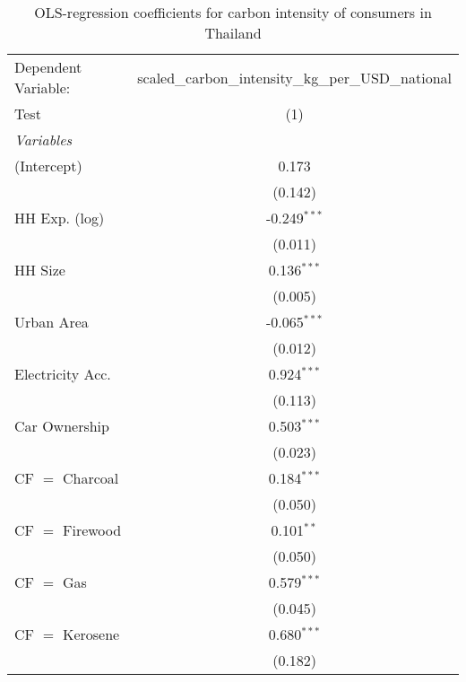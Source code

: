
\begin{table}[htbp!]
   \centering
   \small
   \begin{adjustbox}{width = 1\textwidth, max height = 0.95\textheight, center}
      \begin{threeparttable}[b]
         \caption{\label{tab:OLS_1_THA} OLS-regression coefficients for carbon intensity of consumers in Thailand}
         \begin{tabular}{lc}
            \tabularnewline \midrule \midrule
            Dependent Variable: & scaled\_carbon\_intensity\_kg\_per\_USD\_national\\        
            Test                & (1)\\  
            \midrule
            \emph{Variables}\\
            (Intercept)         & 0.173\\   
                                & (0.142)\\   
            HH Exp. (log)       & -0.249$^{***}$\\   
                                & (0.011)\\   
            HH Size             & 0.136$^{***}$\\   
                                & (0.005)\\   
            Urban Area          & -0.065$^{***}$\\   
                                & (0.012)\\   
            Electricity Acc.    & 0.924$^{***}$\\   
                                & (0.113)\\   
            Car Ownership       & 0.503$^{***}$\\   
                                & (0.023)\\   
            CF $=$ Charcoal     & 0.184$^{***}$\\   
                                & (0.050)\\   
            CF $=$ Firewood     & 0.101$^{**}$\\   
                                & (0.050)\\   
            CF $=$ Gas          & 0.579$^{***}$\\   
                                & (0.045)\\   
            CF $=$ Kerosene     & 0.680$^{***}$\\   
                                & (0.182)\\   

\end{tabular}
\end{threeparttable}
\end{adjustbox}
\end{table}
